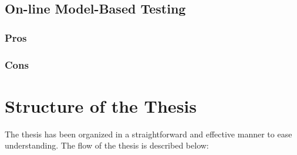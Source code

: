 \subsection{On-line Model-Based Testing}
\subsubsection{Pros}
\subsubsection{Cons}

\section{Structure of the Thesis}
The thesis has been organized in a straightforward and effective manner to ease understanding. The flow of the thesis is described below:

